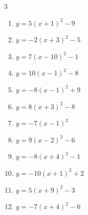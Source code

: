 \begin{multicols}{3}
\begin{enumerate}
  \item $\displaystyle y=5\left( x+1\right)^{2}-9$

        \phantom{$\displaystyle 頂点\left( -1 , -9 \right)$}

  \item $\displaystyle y=-2\left( x+3\right)^{2}-5$

        \phantom{$\displaystyle 頂点\left( -3 , -5 \right)$}

  \item $\displaystyle y=7\left( x-10\right)^{2}-1$

        \phantom{$\displaystyle 頂点\left( 10 , -1 \right)$}

  \item $\displaystyle y=10\left( x-1\right)^{2}-8$

        \phantom{$\displaystyle 頂点\left( 1 , -8 \right)$}

  \item $\displaystyle y=-8\left( x-1\right)^{2}+9$

        \phantom{$\displaystyle 頂点\left( 1 , 9 \right)$}

  \item $\displaystyle y=8\left( x+3\right)^{2}-8$

        \phantom{$\displaystyle 頂点\left( -3 , -8 \right)$}

  \item $\displaystyle y=-7\left( x-1\right)^{2}$

        \phantom{$\displaystyle 頂点\left( 1 , 0 \right)$}

  \item $\displaystyle y=9\left( x-2\right)^{2}-6$

        \phantom{$\displaystyle 頂点\left( 2 , -6 \right)$}

  \item $\displaystyle y=-8\left( x+4\right)^{2}-1$

        \phantom{$\displaystyle 頂点\left( -4 , -1 \right)$}

  \item $\displaystyle y=-10\left( x+1\right)^{2}+2$

        \phantom{$\displaystyle 頂点\left( -1 , 2 \right)$}

  \item $\displaystyle y=5\left( x+9\right)^{2}-3$

        \phantom{$\displaystyle 頂点\left( -9 , -3 \right)$}

  \item $\displaystyle y=-7\left( x+4\right)^{2}-6$


\end{enumerate}
\end{multicols}
